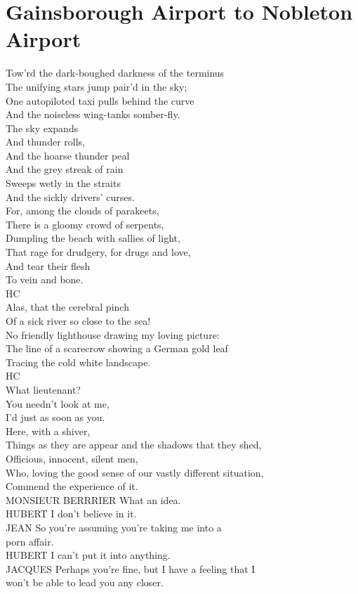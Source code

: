 \documentclass[smalldemyvopaper,11pt,twoside,onecolumn,openright,extrafontsizes]{memoir}
\begin{document}
\chapter{Gainsborough Airport to Nobleton Airport}
Tow'rd the dark-boughed darkness of the terminus
\\The unifying stars jump pair'd in the sky;
\\One autopiloted taxi pulls behind the curve
\\And the noiseless wing-tanks somber-fly.
\\The sky expands
\\And thunder rolls,
\\And the hoarse thunder peal
\\And the grey streak of rain
\\Sweeps wetly in the straits
\\And the sickly drivers' curses.
\\For, among the clouds of parakeets,
\\There is a gloomy crowd of serpents,
\\Dumpling the beach with sallies of light,
\\That rage for drudgery, for drugs and love,
\\And tear their flesh
\\To vein and bone.
\\HC
\\Alas, that the cerebral pinch
\\Of a sick river so close to the sea!
\\No friendly lighthouse drawing my loving picture:
\\The line of a scarecrow showing a German gold leaf
\\Tracing the cold white landscape.
\\HC
\\What lieutenant?
\\You needn't look at me,
\\I'd just as soon as you.
\\Here, with a shiver,
\\Things as they are appear and the shadows that they shed,
\\Officious, innocent, silent men,
\\Who, loving the good sense of our vastly different situation,
\\Commend the experience of it.
\\MONSIEUR BERRRIER What an idea.
\\HUBERT I don't believe in it.
\\JEAN So you're assuming you're taking me into a
\\porn affair.
\\HUBERT I can't put it into anything.
\\JACQUES Perhaps you're fine, but I have a feeling that I
\\won't be able to lead you any closer.
\end{document}
